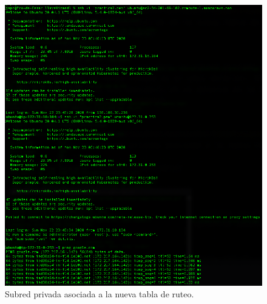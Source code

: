 \documentclass{article}
\begin{document}
\begin{figure}[H]
  \centering
  \includegraphics[width=\textwidth]{SSNAT/result}
  \caption{Subred privada asociada a la nueva tabla
  de ruteo.}
  \label{fig:NAT-result}
\end{figure}
\end{document}
